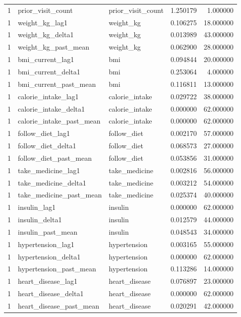 \begin{longtable}{rllrr}
1 & prior\_visit\_count & prior\_visit\_count & 1.250179 & 1.000000 \\
1 & weight\_kg\_lag1 & weight\_kg & 0.106275 & 18.000000 \\
1 & weight\_kg\_delta1 & weight\_kg & 0.013989 & 43.000000 \\
1 & weight\_kg\_past\_mean & weight\_kg & 0.062900 & 28.000000 \\
1 & bmi\_current\_lag1 & bmi & 0.094844 & 20.000000 \\
1 & bmi\_current\_delta1 & bmi & 0.253064 & 4.000000 \\
1 & bmi\_current\_past\_mean & bmi & 0.116811 & 13.000000 \\
1 & calorie\_intake\_lag1 & calorie\_intake & 0.029722 & 38.000000 \\
1 & calorie\_intake\_delta1 & calorie\_intake & 0.000000 & 62.000000 \\
1 & calorie\_intake\_past\_mean & calorie\_intake & 0.000000 & 62.000000 \\
1 & follow\_diet\_lag1 & follow\_diet & 0.002170 & 57.000000 \\
1 & follow\_diet\_delta1 & follow\_diet & 0.068573 & 27.000000 \\
1 & follow\_diet\_past\_mean & follow\_diet & 0.053856 & 31.000000 \\
1 & take\_medicine\_lag1 & take\_medicine & 0.002816 & 56.000000 \\
1 & take\_medicine\_delta1 & take\_medicine & 0.003212 & 54.000000 \\
1 & take\_medicine\_past\_mean & take\_medicine & 0.025374 & 40.000000 \\
1 & insulin\_lag1 & insulin & 0.000000 & 62.000000 \\
1 & insulin\_delta1 & insulin & 0.012579 & 44.000000 \\
1 & insulin\_past\_mean & insulin & 0.048543 & 34.000000 \\
1 & hypertension\_lag1 & hypertension & 0.003165 & 55.000000 \\
1 & hypertension\_delta1 & hypertension & 0.000000 & 62.000000 \\
1 & hypertension\_past\_mean & hypertension & 0.113286 & 14.000000 \\
1 & heart\_disease\_lag1 & heart\_disease & 0.076897 & 23.000000 \\
1 & heart\_disease\_delta1 & heart\_disease & 0.000000 & 62.000000 \\
1 & heart\_disease\_past\_mean & heart\_disease & 0.020291 & 42.000000 \\

\end{longtable}
